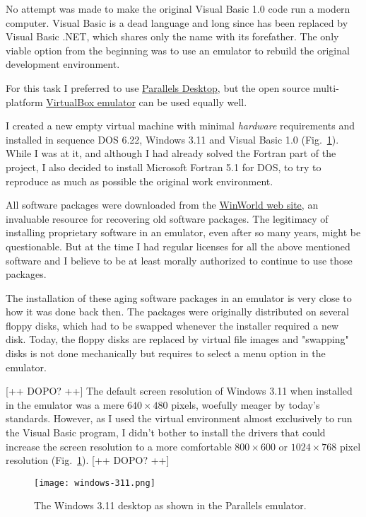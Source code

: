 No attempt was made to make the original Visual Basic 1.0 code run a modern computer. Visual Basic is a dead language and long since has been replaced by Visual Basic .NET, which shares only the name with its forefather. The only viable option from the beginning was to use an emulator to rebuild the original development environment.

For this task I preferred to use \href{https://www.parallels.com/}{Parallels Desktop}, but the open source multi-platform \href{https://www.virtualbox.org/}{VirtualBox emulator} can be used equally well.

I created a new empty virtual machine with minimal \emph{hardware} requirements and installed in sequence DOS 6.22, Windows 3.11 and Visual Basic 1.0 (Fig.~\ref{fig:windows-311}).
While I was at it, and although I had already solved the Fortran part of the project, I also decided to install Microsoft Fortran 5.1 for DOS, to try to reproduce as much as possible the original work environment.

All software packages were downloaded from the \href{https://winworldpc.com}{WinWorld web site}, an invaluable resource for recovering old software packages. 
The legitimacy of installing proprietary software in an emulator, even after so many years, might be questionable. But at the time I had regular licenses for all the above mentioned software and I believe to be at least morally authorized to continue to use those packages.

The installation of these aging software packages in an emulator is very close to how it was done back then.
The packages were originally distributed on several floppy disks, which had to be swapped whenever the installer required a new disk. Today, the floppy disks are replaced by virtual file images and "swapping" disks is not done mechanically but requires to select a menu option in the emulator.

[++ DOPO? ++] The default screen resolution of Windows 3.11 when installed in the emulator was a mere $640  \times 480$ pixels,  woefully meager by today's standards.
However, as I used the virtual environment almost exclusively to run the Visual Basic program, I didn't bother to install the drivers that could increase the screen resolution to a more comfortable $800 \times 600$ or $1024 \times 768$ pixel resolution (Fig.~\ref{fig:windows-311}). [++ DOPO? ++]


\begin{figure}[tbh]
	\centering
	\texttt{[image: windows-311.png]}
	\caption{The Windows 3.11 desktop as shown in the Parallels emulator.}
	\label{fig:windows-311}
\end{figure}


